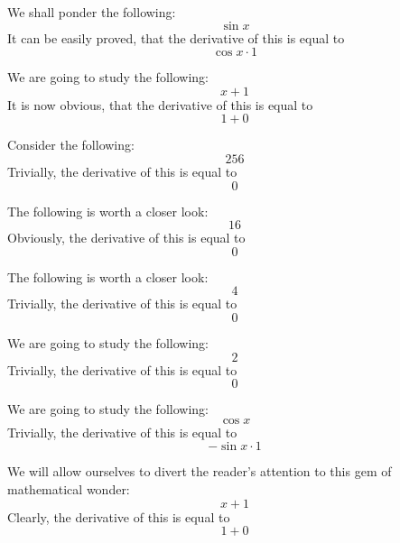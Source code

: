 \documentclass{article}
\begin{document}
We shall ponder the following:
\begin{equation}
\sin x 
\end{equation}
It can be easily proved, that the derivative of this is equal to
\begin{equation}
\cos x \cdot 1 
\end{equation}

We are going to study the following:
\begin{equation}
x + 1 
\end{equation}
It is now obvious, that the derivative of this is equal to
\begin{equation}
1 + 0 
\end{equation}

Consider the following:
\begin{equation}
256 
\end{equation}
Trivially, the derivative of this is equal to
\begin{equation}
0 
\end{equation}

The following is worth a closer look:
\begin{equation}
16 
\end{equation}
Obviously, the derivative of this is equal to
\begin{equation}
0 
\end{equation}

The following is worth a closer look:
\begin{equation}
4 
\end{equation}
Trivially, the derivative of this is equal to
\begin{equation}
0 
\end{equation}

We are going to study the following:
\begin{equation}
2 
\end{equation}
Trivially, the derivative of this is equal to
\begin{equation}
0 
\end{equation}

We are going to study the following:
\begin{equation}
\cos x 
\end{equation}
Trivially, the derivative of this is equal to
\begin{equation}
-\sin x \cdot 1 
\end{equation}

We will allow ourselves to divert the reader's attention to this gem of mathematical wonder:
\begin{equation}
x + 1 
\end{equation}
Clearly, the derivative of this is equal to
\begin{equation}
1 + 0 
\end{equation}
\end{document}
